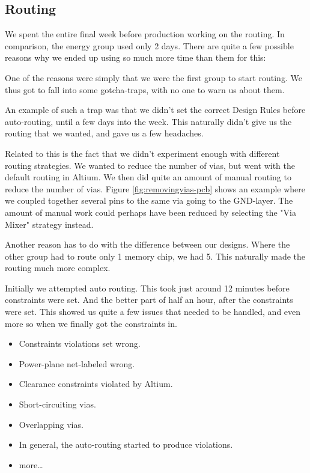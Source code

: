 \subsection {Routing}

We spent the entire final week before production working on the routing. In comparison, the energy group used only 2 days. There are quite a few possible reasons why we ended up using so much more time than them for this:

One of the reasons were simply that we were the first group to start routing. We thus got to fall into some gotcha-traps, with no one to warn us about them.

An example of such a trap was that we didn't set the correct Design Rules before auto-routing, until a few days into the week. This naturally didn't give us the routing that we wanted, and gave us a few headaches.

Related to this is the fact that we didn't experiment enough with different routing strategies. We wanted to reduce the number of vias, but went with the default routing in Altium. We then did quite an amount of manual routing to reduce the number of vias. Figure \ref{fig:removingvias-pcb} shows an example where we coupled together several pins to the same via going to the GND-layer. The amount of manual work could perhaps have been reduced by selecting the "Via Mixer" strategy instead.


Another reason has to do with the difference between our designs. Where the other group had to route only 1 memory chip, we had 5. This naturally made the routing much more complex.

Initially we attempted auto routing. This took just around 12 minutes before constraints were set. And the better part of half an hour, after the constraints were set. This showed us quite a few issues that needed to be handled, and even more so when we finally got the constraints in.

\begin{itemize}
\item Constraints violations set wrong.
\item Power-plane net-labeled wrong.
\item Clearance constraints violated by Altium.
\item Short-circuiting vias.
\item Overlapping vias.
\item In general, the auto-routing started to produce violations.
\item more\ldots
\end{itemize}

